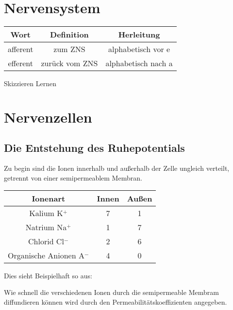 \documentclass{article}
\begin{document}
\section{Nervensystem}  
 
\begin{center}
\begin{tabular}{ |c|c|c| } 
 \hline
 Wort & Definition & Herleitung \\ 
 \hline
 afferent & zum ZNS & alphabetisch vor e \\ 
 efferent & zurück vom ZNS & alphabetisch nach a \\ 
 \hline
\end{tabular}
\end{center}
\noindent Skizzieren Lernen
\section{Nervenzellen}
 
\subsection{Die Entstehung des Ruhepotentials}
Zu begin sind die Ionen innerhalb und außerhalb der Zelle ungleich verteilt, getrennt von einer semipermeablem Membran.
 
\begin{center}
\begin{tabular}{ |c|c|c| }
\hline
 Ionenart & Innen & Außen \\ 
\hline
 Kalium K$^+$ & 7 & 1 \\  
\hline
 Natrium Na$^+$ & 1 & 7 \\
\hline
 Chlorid Cl$^-$ & 2 & 6 \\  
\hline
 Organische Anionen A$^-$ & 4 & 0 \\
\hline 
\end{tabular}
\end{center} 
 
\noindent Dies sieht Beispielhaft so aus:
 
\noindent 
Wie schnell die verschiedenen Ionen durch die semipermeable Membram diffundieren können wird durch den Permeabilitätskoeffizienten angegeben.
 
\end{document}
